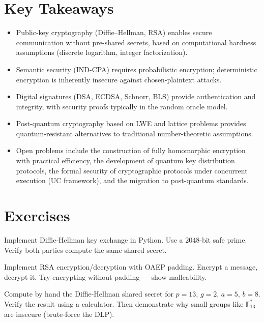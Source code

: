 \section*{Key Takeaways}
\begin{itemize}
\item Public-key cryptography (Diffie--Hellman, RSA) enables secure communication without pre-shared secrets, based on computational hardness assumptions (discrete logarithm, integer factorization).
\item Semantic security (IND-CPA) requires probabilistic encryption; deterministic encryption is inherently insecure against chosen-plaintext attacks.
\item Digital signatures (DSA, ECDSA, Schnorr, BLS) provide authentication and integrity, with security proofs typically in the random oracle model.
\item Post-quantum cryptography based on LWE and lattice problems provides quantum-resistant alternatives to traditional number-theoretic assumptions.
\item Open problems include the construction of fully homomorphic encryption with practical efficiency, the development of quantum key distribution protocols, the formal security of cryptographic protocols under concurrent execution (UC framework), and the migration to post-quantum standards.
\end{itemize}

\section{Exercises}
\label{sec:crypto:exercises}

\begin{exercise}[Basic]
Implement Diffie-Hellman key exchange in Python. Use a 2048-bit safe prime. Verify both parties compute the same shared secret.
\end{exercise}

\begin{exercise}[Basic]
Implement RSA encryption/decryption with OAEP padding. Encrypt a message, decrypt it. Try encrypting without padding — show malleability.
\end{exercise}

\begin{exercise}[Basic]
Compute by hand the Diffie-Hellman shared secret for $p = 13$, $g = 2$, $a = 5$, $b = 8$. Verify the result using a calculator. Then demonstrate why small groups like $\mathbb{F}_{13}^*$ are insecure (brute-force the DLP).
\end{exercise}

